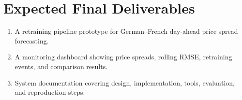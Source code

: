 \documentclass[12pt,a4paper]{article}
\begin{document}
\section{Expected Final Deliverables}

\begin{enumerate}
    \item A retraining pipeline prototype for German--French day-ahead price spread forecasting.
    \item A monitoring dashboard showing price spreads, rolling RMSE, retraining events, and comparison results.
    \item System documentation covering design, implementation, tools, evaluation, and reproduction steps.
\end{enumerate}
\end{document}
